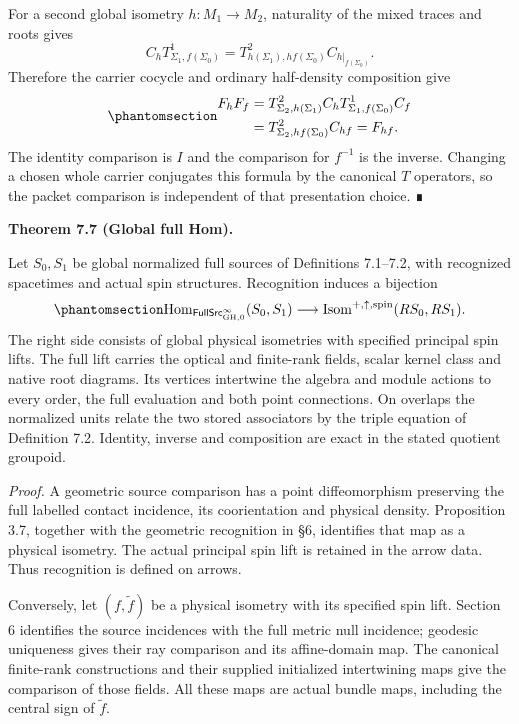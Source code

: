 \documentclass[
  english,
  11pt,
  reqno]{amsart}
\makeatletter
\newcommand{\pandocstatementheading}[1]{%
  \par\if@nobreak\else
    \addpenalty{\@beginparpenalty}%
    \addvspace{.5\baselineskip plus .2\baselineskip minus .2\baselineskip}%
  \fi
  {\normalfont\bfseries #1\par}%
  \nobreak\@afterindenttrue\@afterheading
}
\makeatother
\begin{document}
For a second global isometry \(h:M_1\to M_2\), naturality of the mixed
traces and roots gives \[
C_h T^1_{\Sigma_1,f(\Sigma_0)}
 =T^2_{h(\Sigma_1),hf(\Sigma_0)}C_{h|_{f(\Sigma_0)}}.
\] Therefore the carrier cocycle and ordinary half-density composition
give
\begin{equation}\protect\phantomsection\label{eq:global-native-isometry-composition}{
\begin{aligned}
F_hF_f
 &=T^2_{\Sigma_2,h(\Sigma_1)}C_h
   T^1_{\Sigma_1,f(\Sigma_0)}C_f\\
 &=T^2_{\Sigma_2,hf(\Sigma_0)}C_{hf}
 =F_{hf}.
\end{aligned}
}\end{equation} The identity comparison is \(I\) and the comparison for
\(f^{-1}\) is the inverse. Changing a chosen whole carrier conjugates
this formula by the canonical \(T\) operators, so the packet comparison
is independent of that presentation choice. ∎

\pandocstatementheading{\protect{}\label{thm:global-full-source-hom}Theorem 7.7 (Global full Hom).}

Let \(S_0,S_1\) be global normalized full sources of Definitions
7.1--7.2, with recognized spacetimes and actual spin structures.
Recognition induces a bijection
\begin{equation}\protect\phantomsection\label{eq:global-full-source-hom-bijection}{
\operatorname{Hom}_{\mathsf{FullSrc}^{\infty}_{\mathrm{GH},0}}(S_0,S_1)
\longrightarrow
\operatorname{Isom}^{+,\uparrow,\mathrm{spin}}(R S_0,R S_1).
}\end{equation} The right side consists of global physical isometries
with specified principal spin lifts. The full lift carries the optical
and finite-rank fields, scalar kernel class and native root diagrams.
Its vertices intertwine the algebra and module actions to every order,
the full evaluation and both point connections. On overlaps the
normalized units relate the two stored associators by the triple
equation of Definition 7.2. Identity, inverse and composition are exact
in the stated quotient groupoid.

\emph{Proof.} A geometric source comparison has a point diffeomorphism
preserving the full labelled contact incidence, its coorientation and
physical density. Proposition 3.7, together with the geometric
recognition in §6, identifies that map as a physical isometry. The
actual principal spin lift is retained in the arrow data. Thus
recognition is defined on arrows.

Conversely, let \((f,\widetilde f)\) be a physical isometry with its
specified spin lift. Section 6 identifies the source incidences with the
full metric null incidence; geodesic uniqueness gives their ray
comparison and its affine-domain map. The canonical finite-rank
constructions and their supplied initialized intertwining maps give the
comparison of those fields. All these maps are actual bundle maps,
including the central sign of \(\widetilde f\).
\end{document}

